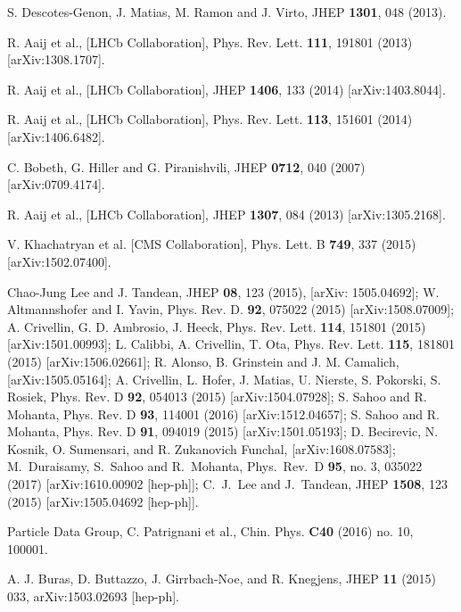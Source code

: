 \documentclass{ws-ijmpa}
\begin{document}
\begin{thebibliography}{99}

 S. Descotes-Genon, J. Matias, M. Ramon and J. Virto, JHEP {\bf 1301}, 048 (2013).

 R. Aaij et al., [LHCb Collaboration], Phys. Rev. Lett. {\bf 111}, 191801 (2013) [arXiv:1308.1707].

 R. Aaij et al., [LHCb Collaboration], JHEP {\bf 1406}, 133 (2014) [arXiv:1403.8044].

 R. Aaij et al., [LHCb Collaboration], Phys. Rev. Lett. {\bf 113}, 151601 (2014) [arXiv:1406.6482].

 C. Bobeth, G. Hiller and G. Piranishvili, JHEP {\bf 0712}, 040 (2007) [arXiv:0709.4174].

 R. Aaij et al., [LHCb Collaboration], JHEP {\bf 1307}, 084 (2013) [arXiv:1305.2168].

 V. Khachatryan et al. [CMS Collaboration], Phys. Lett. B {\bf 749}, 337 (2015) [arXiv:1502.07400].

 Chao-Jung Lee and J. Tandean, JHEP {\bf 08}, 123 (2015), [arXiv: 1505.04692]; W. Altmannshofer
and I. Yavin, Phys. Rev. D. {\bf 92}, 075022 (2015) [arXiv:1508.07009]; A. Crivellin, G. D. Ambrosio,
J. Heeck, Phys. Rev. Lett. {\bf 114}, 151801 (2015) [arXiv:1501.00993]; L. Calibbi, A. Crivellin, T. Ota, Phys. Rev. Lett. {\bf 115}, 181801 (2015) [arXiv:1506.02661]; R. Alonso, B. Grinstein and J.
M. Camalich, [arXiv:1505.05164]; A. Crivellin, L. Hofer, J. Matias, U. Nierste, S. Pokorski, S.
Rosiek, Phys. Rev. D {\bf 92}, 054013 (2015) [arXiv:1504.07928];  S. Sahoo and R. Mohanta, Phys. Rev. D {\bf 93}, 114001 (2016) [arXiv:1512.04657]; S. Sahoo and R. Mohanta, Phys. Rev. D {\bf 91}, 094019 (2015) [arXiv:1501.05193]; D. Becirevic, N. Kosnik, O. Sumensari, and R. Zukanovich Funchal, [arXiv:1608.07583];  M.~Duraisamy, S.~Sahoo and R.~Mohanta,
  Phys.\ Rev.\ D {\bf 95}, no. 3, 035022 (2017)
  [arXiv:1610.00902 [hep-ph]];  C.~J.~Lee and J.~Tandean,
  JHEP {\bf 1508}, 123 (2015)
  [arXiv:1505.04692 [hep-ph]].

 Particle Data Group, C. Patrignani et al., Chin. Phys. {\bf C40} (2016) no. 10, 100001.

 A. J. Buras, D. Buttazzo, J. Girrbach-Noe, and R. Knegjens, JHEP {\bf 11} (2015) 033, arXiv:1503.02693 [hep-ph].

\end{thebibliography}
\end{document}
